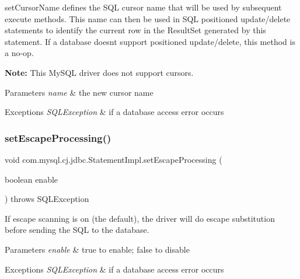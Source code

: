 set\+Cursor\+Name defines the S\+QL cursor name that will be used by subsequent execute methods. This name can then be used in S\+QL positioned update/delete statements to identify the current row in the Result\+Set generated by this statement. If a database doesn\textquotesingle{}t support positioned update/delete, this method is a no-\/op.

{\bfseries Note\+:} This My\+S\+QL driver does not support cursors. 


\begin{DoxyParams}{Parameters}
{\em name} & the new cursor name\\
\hline
\end{DoxyParams}

\begin{DoxyExceptions}{Exceptions}
{\em S\+Q\+L\+Exception} & if a database access error occurs \\
\hline
\end{DoxyExceptions}
\mbox{\label{classcom_1_1mysql_1_1cj_1_1jdbc_1_1_statement_impl_a177506cc06af0885ffceef360e697bb0}} 
\subsubsection{\texorpdfstring{set\+Escape\+Processing()}{setEscapeProcessing()}}
{\footnotesize\ttfamily void com.\+mysql.\+cj.\+jdbc.\+Statement\+Impl.\+set\+Escape\+Processing (\begin{DoxyParamCaption}\item[{boolean}]{enable }\end{DoxyParamCaption}) throws S\+Q\+L\+Exception}

If escape scanning is on (the default), the driver will do escape substitution before sending the S\+QL to the database.


\begin{DoxyParams}{Parameters}
{\em enable} & true to enable; false to disable\\
\hline
\end{DoxyParams}

\begin{DoxyExceptions}{Exceptions}
{\em S\+Q\+L\+Exception} & if a database access error occurs \\
\hline
\end{DoxyExceptions}
\mbox{\label{classcom_1_1mysql_1_1cj_1_1jdbc_1_1_statement_impl_a7f46764af12c9648ac8ac2929b275fd4}} 
